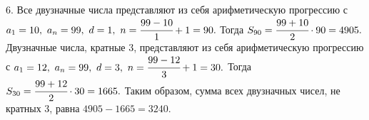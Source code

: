 6. Все двузначные числа представляют из себя арифметическую прогрессию с $a_1=10,\ a_n=99,\ d=1,\ n=\cfrac{99-10}{1}+1=90.$ Тогда $S_{90}=\cfrac{99+10}{2}\cdot90=4905.$ Двузначные числа, кратные 3, представляют из себя арифметическую прогрессию с $a_1=12,\ a_n=99,\ d=3,\ n=\cfrac{99-12}{3}+1=30.$ Тогда $S_{30}=\cfrac{99+12}{2}\cdot30=1665.$ Таким образом, сумма всех двузначных чисел, не кратных 3, равна $4905-1665=3240.$\\
